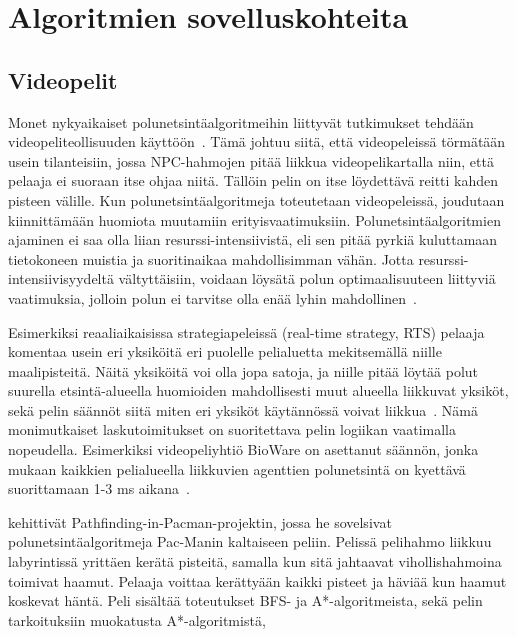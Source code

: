 \chapter{Algoritmien sovelluskohteita} \label{algoritmienSovelluskohteita}

\section{Videopelit}\label{videopelit}
Monet nykyaikaiset polunetsintäalgoritmeihin liittyvät tutkimukset tehdään 
vi\-de\-o\-pe\-li\-te\-ol\-li\-suu\-den 
käyttöön~\cite{MathewAndMalathy}\cite{ACMHindawi}\cite{mazeGameTrilogi}. 
Tämä johtuu siitä, että videopeleissä törmätään usein tilanteisiin, jossa 
NPC-hahmojen pitää liikkua videopelikartalla niin, että pelaaja ei suoraan 
itse ohjaa niitä. Tällöin pelin on itse löydettävä reitti kahden pisteen 
välille. Kun polunetsintäalgoritmeja toteutetaan videopeleissä, joudutaan 
kiinnittämään huomiota muutamiin erityisvaatimuksiin. Polunetsintäalgoritmien 
ajaminen ei saa olla liian resurssi-intensiivistä, eli sen pitää pyrkiä 
kuluttamaan tietoko\-neen muistia ja suoritinaikaa mahdollisimman vähän. Jotta 
resurssi-intensiivisyydel\-tä vältyttäisiin, voidaan löysätä polun 
optimaalisuuteen liittyviä vaatimuksia, jolloin polun ei tarvitse olla enää 
lyhin mahdollinen~\cite{MathewAndMalathy}.\par
	Esimerkiksi reaaliaikaisissa strategiapeleissä (real-time strategy, 
RTS) pelaaja komentaa usein eri yksiköitä eri puolelle pelialuetta 
mekitsemällä niille maalipisteitä. Näitä yksiköitä voi olla jopa satoja, 
ja niille pitää löytää polut suurella etsintä-alueella huomioiden mahdollisesti 
muut alueella liikkuvat yksiköt, sekä pelin säännöt siitä miten eri 
yksiköt käytännössä voivat liikkua~\cite{pPacman}\cite{MathewAndMalathy}. 
Nämä monimutkaiset laskutoimitukset on suoritettava pelin logiikan 
vaatimalla nopeudella. Esimerkiksi videopeliyhtiö BioWare on asettanut 
säännön, jonka mukaan kaikkien pelialueella liikkuvien agenttien polunetsintä 
on kyettävä suorittamaan 1-3 ms aikana~\cite{pPacman}.\par
	\textcite{pPacman} kehittivät Pathfinding-in-Pacman-projektin, jossa 
he sovelsivat polunetsintäalgoritmeja Pac-Manin kaltaiseen peliin. Pelissä 
pelihahmo liikkuu labyrintissä yrittäen kerätä pisteitä, samalla kun sitä 
jahtaavat vihollishahmoina toimivat haamut. Pelaaja voittaa kerättyään kaikki 
pisteet ja häviää kun haamut koskevat häntä. Peli sisältää toteutukset BFS- 
ja A*-algoritmeista, sekä pelin tarkoituksiin muokatusta A*-algoritmistä, 
